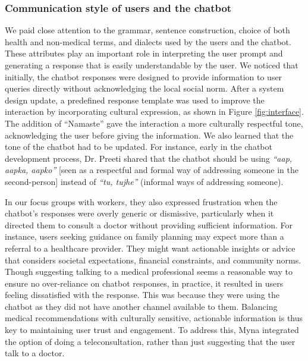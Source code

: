 \subsubsection{Communication style of users and the chatbot}
We paid close attention to the grammar, sentence construction, choice of both health and non-medical terms, and dialects used by the users and the chatbot. 
These attributes play an important role in interpreting the user prompt and generating a response that is easily understandable by the user.
We noticed that initially, the chatbot responses were designed to provide information to user queries directly without acknowledging the local social norm. After a system design update, a predefined response template was used to improve the interaction by incorporating cultural expression, as shown in Figure \ref{fig:interface}. The addition of ``Namaste'' gave the interaction a more culturally respectful tone, acknowledging the user before giving the information. 
We also learned that the tone of the chatbot had to be updated. For instance, early in the chatbot development process, Dr. Preeti shared that the chatbot should be using \textit{``aap, aapka, aapko''} [seen as a respectful and formal way of addressing someone in the second-person] instead of \textit{``tu, tujhe''} (informal ways of addressing someone).

In our focus groups with workers, they also expressed frustration when the chatbot's responses were overly generic or dismissive, particularly when it directed them to consult a doctor without providing sufficient information. For instance, users seeking guidance on family planning may expect more than a referral to a healthcare provider. They might want actionable insights or advice that considers societal expectations, financial constraints, and community norms. 
Though suggesting talking to a medical professional seems a reasonable way to ensure no over-reliance on chatbot responses, in practice, it resulted in users feeling dissatisfied with the response. This was because they were using the chatbot as they did not have another channel available to them.
Balancing medical recommendations with culturally sensitive, actionable information is thus key to maintaining user trust and engagement. To address this, Myna integrated the option of doing a teleconsultation, rather than just suggesting that the user talk to a doctor.


